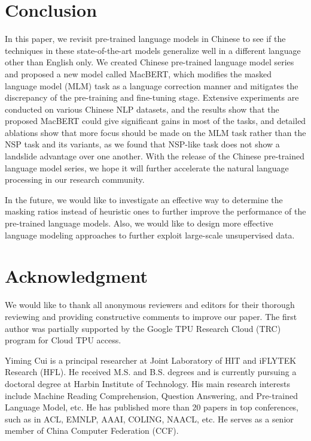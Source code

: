 \documentclass[journal]{IEEEtran}
\begin{document}
\begin{CJK*}{UTF8}{gbsn}
\section{Conclusion}
In this paper, we revisit pre-trained language models in Chinese to see if the techniques in these state-of-the-art models generalize well in a different language other than English only.
We created Chinese pre-trained language model series and proposed a new model called MacBERT, which modifies the masked language model (MLM) task as a language correction manner and mitigates the discrepancy of the pre-training and fine-tuning stage.
Extensive experiments are conducted on various Chinese NLP datasets, and the results show that the proposed MacBERT could give significant gains in most of the tasks, and detailed ablations show that more focus should be made on the MLM task rather than the NSP task and its variants, as we found that NSP-like task does not show a landslide advantage over one another.
With the release of the Chinese pre-trained language model series, we hope it will further accelerate the natural language processing in our research community.

In the future, we would like to investigate an effective way to determine the masking ratios instead of heuristic ones to further improve the performance of the pre-trained language models.
Also, we would like to design more effective language modeling approaches to further exploit large-scale unsupervised data.


\section*{Acknowledgment}
We would like to thank all anonymous reviewers and editors for their thorough reviewing and providing constructive comments to improve our paper. 
The first author was partially supported by the Google TPU Research Cloud (TRC) program for Cloud TPU access.


\ifCLASSOPTIONcaptionsoff
  \newpage
\fi















\begin{IEEEbiography}{Yiming Cui}
is a principal researcher at Joint Laboratory of HIT and iFLYTEK Research (HFL).
He received M.S. and B.S. degrees and is currently pursuing a doctoral degree at Harbin Institute of Technology.
His main research interests include Machine Reading Comprehension, Question Answering, and Pre-trained Language Model, etc. 
He has published more than 20 papers in top conferences, such as in ACL, EMNLP, AAAI, COLING, NAACL, etc.
He serves as a senior member of China Computer Federation (CCF).
\end{IEEEbiography}


\end{CJK*}
\end{document}
